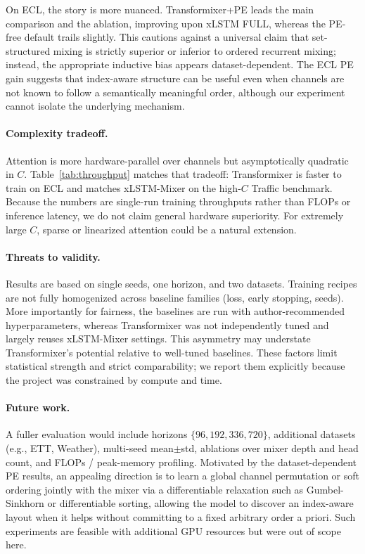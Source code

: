 \documentclass{article}
\begin{document}
On ECL, the story is more nuanced.
Transformixer+PE leads the main comparison and the ablation, improving upon xLSTM FULL, whereas the PE-free default trails slightly.
This cautions against a universal claim that set-structured mixing is strictly superior or inferior to ordered recurrent mixing; instead, the appropriate inductive bias appears dataset-dependent.
The ECL PE gain suggests that index-aware structure can be useful even when channels are not known to follow a semantically meaningful order, although our experiment cannot isolate the underlying mechanism.

\paragraph{Complexity tradeoff.}
Attention is more hardware-parallel over channels but asymptotically quadratic in $C$.
Table~\ref{tab:throughput} matches that tradeoff: Transformixer is faster to train on ECL and matches xLSTM-Mixer on the high-$C$ Traffic benchmark.
Because the numbers are single-run training throughputs rather than FLOPs or inference latency, we do not claim general hardware superiority.
For extremely large $C$, sparse or linearized attention could be a natural extension.

\paragraph{Threats to validity.}
Results are based on single seeds, one horizon, and two datasets.
Training recipes are not fully homogenized across baseline families (loss, early stopping, seeds).
More importantly for fairness, the baselines are run with author-recommended hyperparameters, whereas Transformixer was not independently tuned and largely reuses xLSTM-Mixer settings.
This asymmetry may understate Transformixer's potential relative to well-tuned baselines.
These factors limit statistical strength and strict comparability; we report them explicitly because the project was constrained by compute and time.

\paragraph{Future work.}
A fuller evaluation would include horizons $\{96,192,336,720\}$, additional datasets (e.g., ETT, Weather), multi-seed mean$\pm$std, ablations over mixer depth and head count, and FLOPs / peak-memory profiling.
Motivated by the dataset-dependent PE results, an appealing direction is to learn a global channel permutation or soft ordering jointly with the mixer via a differentiable relaxation such as Gumbel-Sinkhorn or differentiable sorting, allowing the model to discover an index-aware layout when it helps without committing to a fixed arbitrary order a priori.
Such experiments are feasible with additional GPU resources but were out of scope here.
\end{document}
